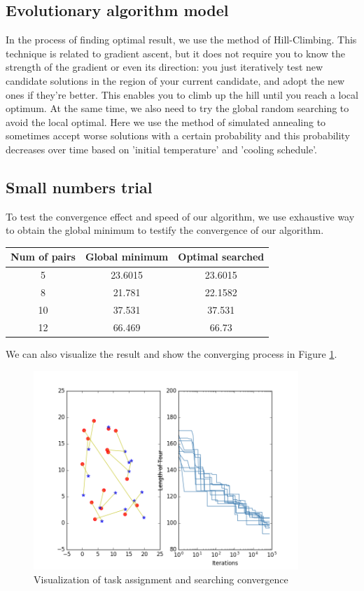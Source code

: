 \documentclass[a4paper]{article}
\begin{document}
\subsection{Evolutionary algorithm model}

In the process of finding optimal result, we use the method of Hill-Climbing. This technique is related to gradient ascent, but it does not require you to know the strength of the gradient or even its direction: you just iteratively test new candidate solutions in the region of your current candidate, and adopt the new ones if they’re better. This enables you to climb up the hill until you reach a local optimum.\cite{Luke2013Metaheuristics} At the same time, we also need to try the global random searching to avoid the local optimal. Here we use the method of simulated annealing to sometimes accept worse solutions with a certain probability and this probability decreases over time based on 'initial temperature' and 'cooling schedule'\cite{johnson1989optimization}.


\subsection{Small numbers trial}
To test the convergence effect and speed of our algorithm, we use exhaustive way to obtain the global minimum to testify the convergence of our algorithm.
\begin{center}
	\begin{tabular}[c]{ |c|c|c| } 
		\hline
		Num of pairs & Global minimum & Optimal searched\\
		\hline 
		5   & 23.6015 & 23.6015 \\ \hline 
		8   & 21.781  & 22.1582 \\ \hline
		10  & 37.531  & 37.531  \\ \hline
		12  & 66.469  & 66.73   \\ \hline
	\end{tabular}
\end{center}
We can also visualize the result and show the converging process in Figure \ref{fig1}.
 \begin{figure}[h]
 \centering
 \includegraphics[width=10cm]{Pictures/N10.png}
 \caption{Visualization of task assignment and searching convergence} 
 \label{fig1}
 \end{figure}
\end{document}
